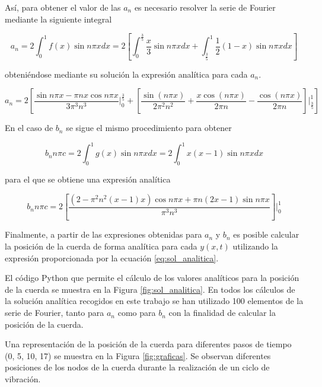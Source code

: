 \documentclass[11pt]{article}
\begin{document}
Así, para obtener el valor de las $a_n$ es necesario resolver la serie de Fourier mediante
la siguiente integral

\begin{equation}
	a_n = 2 \int_0^1 f(x) \sin{n\pi{x}}dx = 2[\int_0^\frac{3}{5} \frac{x}{3} \sin{n\pi{x}}dx
	+ \int_{\frac{3}{5}}^1 \frac{1}{2}(1-x) \sin{n\pi{x}}dx]
\end{equation}

obteniéndose mediante su solución la expresión analítica para cada $a_n$.

\begin{equation}
	a_n = 2 [\frac{\sin{n\pi{x}} - \pi{n}x\cos{n\pi{x}}}{3\pi^3n^3}\rvert_0^\frac{3}{5}
	+ [\frac{\sin(n\pi{x})}{2\pi^2n^2} + \frac{x\cos(n\pi{x})}{2\pi{n}} - \frac{\cos(n\pi{x})}{2\pi{n}}]\rvert_{\frac{3}{5}}^1]
\end{equation}

En el caso de $b_n$ se sigue el mismo procedimiento para obtener

\begin{equation}
	b_n n\pi{c} = 2 \int_0^1 g(x) \sin{n\pi{x}}dx = 2 \int_0^1 x(x-1) \sin{n\pi{x}}dx 
\end{equation}

para el que se obtiene una expresión analítica

\begin{equation}
	b_n n\pi{c} = 2[\frac{(2 - \pi^2n^2(x-1)x)\cos{n\pi{x}} + \pi{n}(2x - 1)\sin{n\pi{x}}}{\pi^3n^3}]\rvert_0^1 
\end{equation}

Finalmente, a partir de las expresiones obtenidas para $a_n$ y $b_n$ es posible calcular
la posición de la cuerda de forma analítica para cada $y(x,t)$ utilizando la expresión
proporcionada por la ecuación \eqref{eq:sol_analitica}.

El código Python que permite el cálculo de los valores analíticos para la posición de la
cuerda se muestra en la Figura \ref{fig:sol_analitica}. En todos los cálculos de la solución
analítica recogidos en este trabajo se han utilizado 100 elementos de la serie de Fourier,
tanto para $a_n$ como para $b_n$ con la finalidad de calcular la posición de la cuerda.

Una representación de la posición de la cuerda para diferentes pasos de tiempo
(0, 5, 10, 17) se muestra en la Figura \ref{fig:graficas}. Se observan diferentes
posiciones de los nodos de la cuerda durante la realización de un ciclo de vibración.
\end{document}
